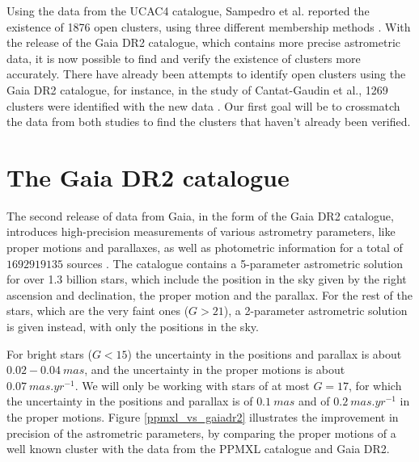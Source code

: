 \documentclass[twocolumn]{revtex4}
\begin{document}
Using the data from the UCAC4 catalogue, Sampedro et al. reported the existence of 1876 open clusters, using three different membership methods \cite{sampedro}. With the release of the Gaia DR2 catalogue, which contains more precise astrometric data, it is now possible to find and verify the existence of clusters more accurately.
There have already been attempts to identify open clusters using the Gaia DR2 catalogue, for instance, in the study of Cantat-Gaudin et al., 1269 clusters were identified with the new data \cite{cantat-gaudin}. Our first goal will be to crossmatch the data from both studies to find the clusters that haven't already been verified.


\section{The Gaia DR2 catalogue}
The second release of data from Gaia, in the form of the Gaia DR2 catalogue, introduces high-precision measurements of various astrometry parameters, like proper motions and parallaxes, as well as photometric information for a total of $1 692 919 135$ sources \cite{gaiadr2}. The catalogue contains a 5-parameter astrometric solution for over 1.3 billion stars, which include the position in the sky given by the right ascension and declination, the proper motion and the parallax. For the rest of the stars, which are the very faint ones ($G > 21$), a 2-parameter astrometric solution is given instead, with only the positions in the sky.

For bright stars ($G < 15$) the uncertainty in the positions and parallax is about $0.02-0.04\ \si{mas}$, and the uncertainty in the proper motions is about $0.07\ \si{mas.yr^{-1}}$. We will only be working with stars of at most $G = 17$, for which the uncertainty in the positions and parallax is of $0.1\ \si{mas}$ and of $0.2\ \si{mas.yr^{-1}}$ in the proper motions. Figure \ref{ppmxl_vs_gaiadr2} illustrates the improvement in precision of the astrometric parameters, by comparing the proper motions of a well known cluster with the data from the PPMXL catalogue \cite{ppmxl} and Gaia DR2.
\end{document}
